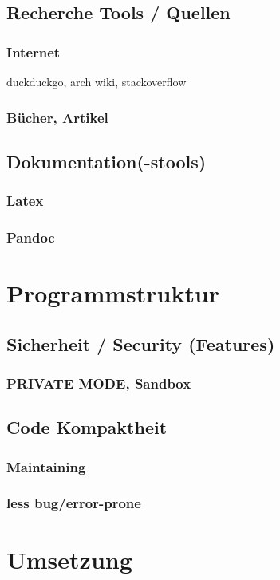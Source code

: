 \documentclass[a4paper,11pt]{article}
\begin{document}
\subsection{Recherche Tools / Quellen}
\subsubsection{Internet}
duckduckgo, arch wiki, stackoverflow
\subsubsection{Bücher, Artikel}

\subsection{Dokumentation(-stools)}
\subsubsection{Latex}
\subsubsection{Pandoc}

\section{Programmstruktur}

\subsection{Sicherheit / Security (Features)}
\subsubsection{PRIVATE MODE, Sandbox}

\subsection{Code Kompaktheit}
\subsubsection{Maintaining}
\subsubsection{less bug/error-prone}

\section{Umsetzung}
\end{document}
